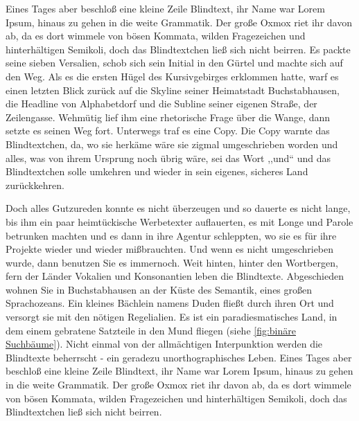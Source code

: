 \documentclass[12pt,a4paper,twoside]{scrartcl}
\numberwithin{equation}{section}
\begin{document}
Eines Tages aber beschloß eine kleine Zeile Blindtext, ihr Name war Lorem Ipsum, hinaus zu gehen in die weite Grammatik. Der große Oxmox riet ihr davon ab, da es dort wimmele von bösen Kommata, wilden Fragezeichen und hinterhältigen Semikoli, doch das Blindtextchen ließ sich nicht beirren. Es packte seine sieben Versalien, schob sich sein Initial in den Gürtel und machte sich auf den Weg. Als es die ersten Hügel des Kursivgebirges erklommen hatte, warf es einen letzten Blick zurück auf die Skyline seiner Heimatstadt Buchstabhausen, die Headline von Alphabetdorf und die Subline seiner eigenen Straße, der Zeilengasse. Wehmütig lief ihm eine rhetorische Frage über die Wange, dann setzte es seinen Weg fort. Unterwegs traf es eine Copy. Die Copy warnte das Blindtextchen, da, wo sie herkäme wäre sie zigmal umgeschrieben worden und alles, was von ihrem Ursprung noch übrig wäre, sei das Wort ,,und`` und das Blindtextchen solle umkehren und wieder in sein eigenes, sicheres Land zurückkehren.

Doch alles Gutzureden konnte es nicht überzeugen und so dauerte es nicht lange, bis ihm ein paar heimtückische Werbetexter auflauerten, es mit Longe und Parole betrunken machten und es dann in ihre Agentur schleppten, wo sie es für ihre Projekte wieder und wieder mißbrauchten. Und wenn es nicht umgeschrieben wurde, dann benutzen Sie es immernoch. Weit hinten, hinter den Wortbergen, fern der Länder Vokalien und Konsonantien leben die Blindtexte. Abgeschieden wohnen Sie in Buchstabhausen an der Küste des Semantik, eines großen Sprachozeans. Ein kleines Bächlein namens Duden fließt durch ihren Ort und versorgt sie mit den nötigen Regelialien. Es ist ein paradiesmatisches Land, in dem einem gebratene Satzteile in den Mund fliegen (siehe \autoref{fig:binäre Suchbäume}). Nicht einmal von der allmächtigen Interpunktion werden die Blindtexte beherrscht - ein geradezu unorthographisches Leben. Eines Tages aber beschloß eine kleine Zeile Blindtext, ihr Name war Lorem Ipsum, hinaus zu gehen in die weite Grammatik. Der große Oxmox riet ihr davon ab, da es dort wimmele von bösen Kommata, wilden Fragezeichen und hinterhältigen Semikoli, doch das Blindtextchen ließ sich nicht beirren.
\end{document}
